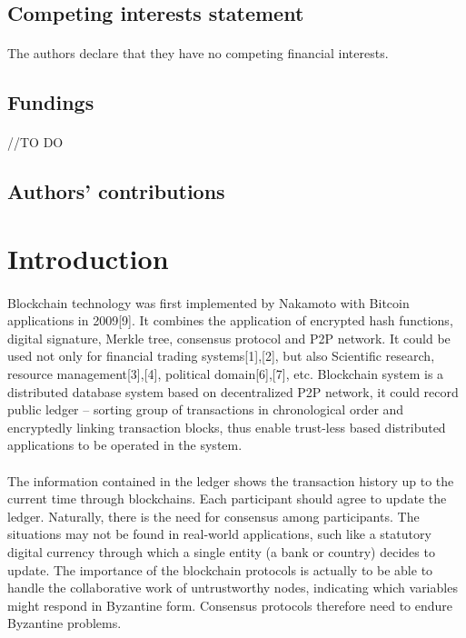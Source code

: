 \documentclass[]{article}
\begin{document}
\begin{CJK*}{UTF8}{gbsn}
\begin{center}
	\subsection*{Competing interests statement}
\end{center}
\paragraph{}
The authors declare that they have no competing financial interests.
\begin{center}
	\subsection*{Fundings}
\end{center}
\paragraph{}
//TO DO
\begin{center}
	\subsection*{Authors' contributions}
\end{center}
\paragraph{}


\section{Introduction}
\paragraph{}
Blockchain technology was first implemented by Nakamoto with Bitcoin applications in 2009[9]. It combines the application of encrypted hash functions, digital signature, Merkle tree, consensus protocol and P2P network. It could be used not only for financial trading systems[1],[2], but also Scientific   research,  resource management[3],[4], political domain[6],[7], etc. Blockchain system is a distributed database system based on decentralized P2P network,  it could record public ledger – sorting group of transactions in chronological order and encryptedly linking transaction blocks,  thus enable trust-less based distributed applications to be operated in the system.
	\paragraph{}
	The information contained in the ledger shows the transaction history up to the current time through blockchains. Each participant should agree to update the ledger. Naturally, there is the need for consensus among participants. The situations may not be found in  real-world applications, such like a statutory digital currency through which a single entity (a bank or country) decides to update. The importance of the blockchain protocols is actually to be able to handle the collaborative work of untrustworthy nodes, indicating which variables might respond in Byzantine form. Consensus protocols therefore need to endure Byzantine problems.

\end{CJK*}
\end{document}
